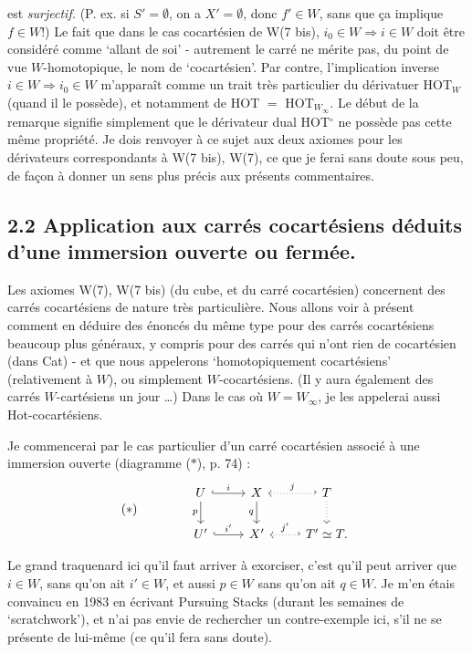 \documentclass[11pt]{article}
\newcommand{\printedpage}[1]{\marginpar{\footnotesize p.~#1}}
\newcommand{\msp}[1]{\marginpar{\footnotesize [#1]}}
\begin{document}
\printedpage{58}

est \textit{surjectif.} (P. ex. si $S'=\emptyset$, on a $X'=\emptyset$, donc $f'\in W$, sans que ça implique $f\in W$!) Le fait que dans le cas cocartésien de W(7 bis), $i_0\in W\Longrightarrow i\in W$ doit être considéré comme ‘allant de soi’ - autrement le carré ne mérite pas, du point de vue $W$-homotopique, le nom de ‘cocartésien’. Par contre, l’implication inverse $i\in W\Longrightarrow i_0\in W$ m’apparaît comme un trait très particulier du dérivatuer HOT$_W$ (quand il le possède), et notamment %
de HOT $=$ HOT$_{W_\infty}$. Le début
\msp{page 80}
de la remarque signifie simplement que le dérivateur dual HOT$^\circ$ ne possède pas cette même propriété. Je dois renvoyer à ce sujet aux deux axiomes pour les dérivateurs correspondants à W(7 bis), W(7), ce que je ferai sans doute sous peu, de façon à donner un sens plus précis aux présents commentaires.

\subsection*{2.2 Application aux carrés cocartésiens déduits d’une immersion ouverte ou fermée.}

Les axiomes W(7), W(7 bis) (du cube, et du carré cocartésien) concernent des carrés cocartésiens de nature très particulière. Nous allons voir à présent comment en déduire des énoncés du même type pour des carrés cocartésiens beaucoup plus généraux, y compris pour des carrés qui n’ont rien de cocartésien (dans Cat) - et que nous appelerons %
‘homotopiquement cocartésiens’ (relativement à $W$), ou simplement $W$-cocartésiens. (Il y aura également des carrés $W$-cartésiens un jour \dots) Dans le cas où $W=W_\infty$, je les appelerai aussi Hot-cocartésiens. %

Je commencerai par le cas particulier d’un carré cocartésien associé à une immersion ouverte (diagramme ($*$), p. 74) :
\[
(*)\qquad\qquad
\begin{tikzcd}
U \arrow[r, hook, "i"] \arrow[d, "p"'] & X \arrow[d, "q"'] & T \arrow[l, hook', dotted, "j"'] \arrow[d, dotted] \\
U' \arrow[r, hook, "i'"] & X' & T'\simeq T. \arrow[l, hook', dotted, "j'"']
\end{tikzcd}
\]
\msp{page 81}

Le grand traquenard ici qu’il faut arriver à exorciser, c’est qu’il peut arriver que $i\in W$, sans qu’on ait $i'\in W$, et aussi $p\in W$ sans qu’on ait $q\in W$. Je m’en étais convaincu en 1983 en écrivant Pursuing Stacks (durant les semaines de ‘scratchwork’), et n’ai pas envie de rechercher un contre-exemple ici, s’il ne se présente de lui-même (ce qu’il fera sans doute).
\end{document}
